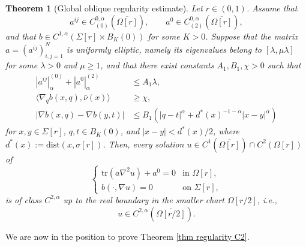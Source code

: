 \documentclass[10pt,a4paper, reqno]{amsart}
\numberwithin{equation}{section}
\newtheorem{teo}{Theorem}[section]
\begin{document}
\begin{teo}[Global oblique regularity estimate]\label{lieberman-teor}
Let $r \in (0,1)$.  Assume that
\[
    a^{ij}\in C_{(0)}^{0,\alpha}(\overline{\Omega[r]}),\qquad a^0\in C_{(2)}^{0,\alpha}(\overline{\Omega[r]}),
\]
and that $b\in C^{1,\alpha}(\Sigma[r]\times B_K(0))$ for some $K>0$.  Suppose that the matrix $a=(a^{ij})_{i,j=1}^N$ is uniformly elliptic, namely its eigenvalues belong to $[\lambda,\mu\lambda]$ for some $\lambda>0$ and $\mu\ge1$, and that there exist constants $A_1,B_1,\chi>0$ such that
\begin{align}
    |a^{ij}|_{\alpha}^{(0)}+|a^0|_{\alpha}^{(2)}&\le A_1\lambda,
    \label{teor-L1}\\
    \langle \nabla_q b(x,q), \bar{\nu}(x) \rangle &\ge \chi,
    \label{teor-L2}\\
    |\nabla b(x,q)-\nabla b(y,t)|
    &\le B_1\left(|q-t|^{\alpha}+d^\ast(x)^{-1-\alpha}|x-y|^{\alpha}\right)
    \label{teor-L3}
\end{align}
for $x,y\in\Sigma[r]$, $q,t\in B_K(0)$, and $|x-y|<d^\ast(x)/2$, where $d^\ast(x):= \mathrm{dist}(x,\sigma[r])$.  Then, every solution $u \in C^1(\overline{\Omega[r]}) \cap C^2(\Omega[r])$ of
\begin{equation*}
\begin{cases}
    \mathrm{tr} ( a \nabla^2 u) + a^0 =0 & \text{in }\Omega[r],\\
    b(\cdot , \nabla u)=0 & \text{on }\Sigma[r],
\end{cases}
\end{equation*}
is of class $C^{2,\alpha}$ up to the real boundary in the smaller chart $\Omega[r/2]$, i.e.,
\[
    u\in C^{2,\alpha}\left(\overline{\Omega[r/2]}\right).
\]
\end{teo}

We are now in the position to prove Theorem \ref{thm regularity C2}.
\end{document}

